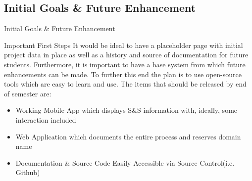 \documentclass{beamer}
\begin{document}
\subsection{Initial Goals \& Future Enhancement}

\begin{frame}{Initial Goals \& Future Enhancement}

\begin{block}{Important First Steps}
It would be ideal to have a placeholder page with initial project data in place as well as a history and source of documentation for future students. Furthermore, it is important to have a base system from which future enhancements can be made. To further this end the plan is to use open-source tools which are easy to learn and use. The items that should be released by end of semester are:
\end{block}

\begin{itemize}
\item Working Mobile App which displays S\&S information with, ideally, some interaction included
\item Web Application which documents the entire process and reserves domain name
\item Documentation \& Source Code Easily Accessible via Source Control(i.e. Github)
\end{itemize}

\end{frame}
\end{document}
